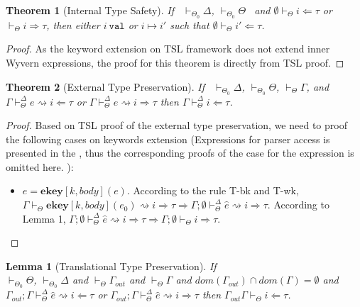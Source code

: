 \documentclass{sig-alternate}
\newcommand{\myvdash}{\vdash_{\Theta}^{\Delta}}
\newtheorem{theorem}{Theorem}
\newtheorem{lemma}{Lemma}
\begin{document}
\begin{theorem}[Internal Type Safety]
If ~$\vdash_{\Theta_0}\Delta$, $\vdash_{\Theta_0}\Theta$~ and $\emptyset\vdash_{\Theta}i\Leftarrow\tau$ or $\vdash_{\Theta}i\Rightarrow\tau$, then either $i~\texttt{val}$ or $i\mapsto i'$ such that $\emptyset\vdash_{\Theta}i'\Leftarrow\tau$.
\end{theorem}
\begin{proof}
As the keyword extension on TSL framework does not extend inner Wyvern expressions, the proof for this theorem is directly from TSL proof. 
\end{proof}

\begin{theorem}[External Type Preservation]
If ~$\vdash_{\Theta_0}\Delta$, $\vdash_{\Theta_0}\Theta$, $\vdash_{\Theta}\Gamma$, and $\Gamma\myvdash e\rightsquigarrow i\Leftarrow\tau$ or $\Gamma\myvdash e\rightsquigarrow i\Rightarrow\tau$ then $\Gamma\myvdash i\Leftarrow\tau$.
\end{theorem}
\begin{proof}
Based on TSL proof of the external type preservation, we need to proof the following cases on keywords extension (Expressions for parser access is presented in the , thus the corresponding proofs of the case for the expression is omitted here. ):
\begin{itemize}
\item $e=\mathbf{ekey}[k,body](e)$. According to the rule T-bk and T-wk, $\Gamma\vdash_{\Theta}\mathbf{ekey}[k,body](e_0) \rightsquigarrow i \Rightarrow \tau \Longrightarrow \Gamma;\emptyset\myvdash \hat{e} \rightsquigarrow i \Rightarrow \tau$. According to Lemma 1, $\Gamma;\emptyset\myvdash \hat{e} \rightsquigarrow i \Rightarrow \tau \Longrightarrow \Gamma;\emptyset\vdash_{\Theta} i\Rightarrow\tau$.
\end{itemize}
\end{proof}

\begin{lemma}[Translational Type Preservation]
If \\$\vdash_{\Theta_0}\Theta$, $\vdash_{\Theta_0}\Delta$ and $\vdash_{\Theta}\Gamma_{out}$ and $\vdash_{\Theta}\Gamma$ and $dom(\Gamma_{out})\cap dom(\Gamma)=\emptyset$ and $\Gamma_{out};\Gamma\vdash_{\Theta}^{\Delta}\hat{e}\rightsquigarrow i\Leftarrow\tau$ or $\Gamma_{out};\Gamma\vdash_{\Theta}^{\Delta}\hat{e}\rightsquigarrow i\Rightarrow \tau$ then $\Gamma_{out}\Gamma\vdash_{\Theta}i\Leftarrow \tau$.
\end{lemma}
\end{document}
